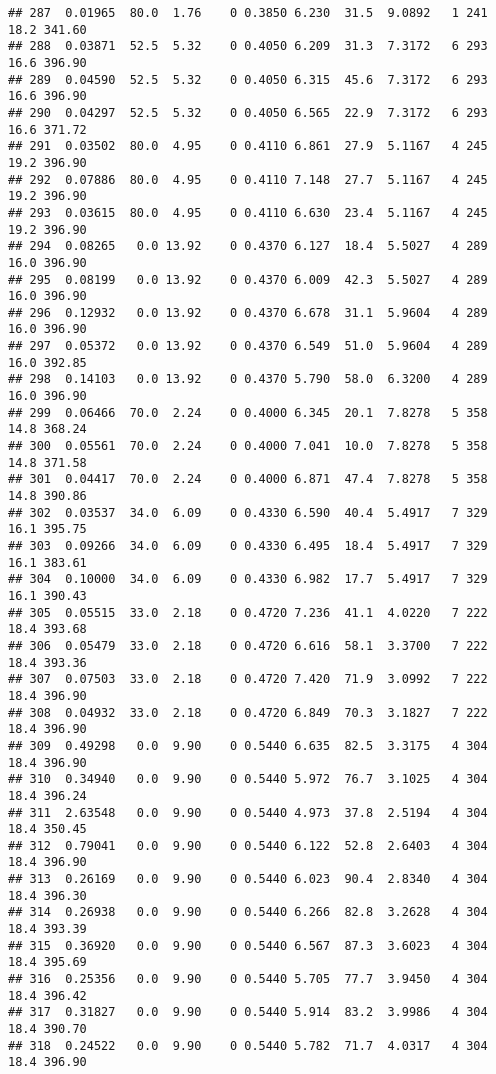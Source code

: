 \documentclass[
]{article}
\begin{document}
\begin{verbatim}
## 287  0.01965  80.0  1.76    0 0.3850 6.230  31.5  9.0892   1 241    18.2 341.60
## 288  0.03871  52.5  5.32    0 0.4050 6.209  31.3  7.3172   6 293    16.6 396.90
## 289  0.04590  52.5  5.32    0 0.4050 6.315  45.6  7.3172   6 293    16.6 396.90
## 290  0.04297  52.5  5.32    0 0.4050 6.565  22.9  7.3172   6 293    16.6 371.72
## 291  0.03502  80.0  4.95    0 0.4110 6.861  27.9  5.1167   4 245    19.2 396.90
## 292  0.07886  80.0  4.95    0 0.4110 7.148  27.7  5.1167   4 245    19.2 396.90
## 293  0.03615  80.0  4.95    0 0.4110 6.630  23.4  5.1167   4 245    19.2 396.90
## 294  0.08265   0.0 13.92    0 0.4370 6.127  18.4  5.5027   4 289    16.0 396.90
## 295  0.08199   0.0 13.92    0 0.4370 6.009  42.3  5.5027   4 289    16.0 396.90
## 296  0.12932   0.0 13.92    0 0.4370 6.678  31.1  5.9604   4 289    16.0 396.90
## 297  0.05372   0.0 13.92    0 0.4370 6.549  51.0  5.9604   4 289    16.0 392.85
## 298  0.14103   0.0 13.92    0 0.4370 5.790  58.0  6.3200   4 289    16.0 396.90
## 299  0.06466  70.0  2.24    0 0.4000 6.345  20.1  7.8278   5 358    14.8 368.24
## 300  0.05561  70.0  2.24    0 0.4000 7.041  10.0  7.8278   5 358    14.8 371.58
## 301  0.04417  70.0  2.24    0 0.4000 6.871  47.4  7.8278   5 358    14.8 390.86
## 302  0.03537  34.0  6.09    0 0.4330 6.590  40.4  5.4917   7 329    16.1 395.75
## 303  0.09266  34.0  6.09    0 0.4330 6.495  18.4  5.4917   7 329    16.1 383.61
## 304  0.10000  34.0  6.09    0 0.4330 6.982  17.7  5.4917   7 329    16.1 390.43
## 305  0.05515  33.0  2.18    0 0.4720 7.236  41.1  4.0220   7 222    18.4 393.68
## 306  0.05479  33.0  2.18    0 0.4720 6.616  58.1  3.3700   7 222    18.4 393.36
## 307  0.07503  33.0  2.18    0 0.4720 7.420  71.9  3.0992   7 222    18.4 396.90
## 308  0.04932  33.0  2.18    0 0.4720 6.849  70.3  3.1827   7 222    18.4 396.90
## 309  0.49298   0.0  9.90    0 0.5440 6.635  82.5  3.3175   4 304    18.4 396.90
## 310  0.34940   0.0  9.90    0 0.5440 5.972  76.7  3.1025   4 304    18.4 396.24
## 311  2.63548   0.0  9.90    0 0.5440 4.973  37.8  2.5194   4 304    18.4 350.45
## 312  0.79041   0.0  9.90    0 0.5440 6.122  52.8  2.6403   4 304    18.4 396.90
## 313  0.26169   0.0  9.90    0 0.5440 6.023  90.4  2.8340   4 304    18.4 396.30
## 314  0.26938   0.0  9.90    0 0.5440 6.266  82.8  3.2628   4 304    18.4 393.39
## 315  0.36920   0.0  9.90    0 0.5440 6.567  87.3  3.6023   4 304    18.4 395.69
## 316  0.25356   0.0  9.90    0 0.5440 5.705  77.7  3.9450   4 304    18.4 396.42
## 317  0.31827   0.0  9.90    0 0.5440 5.914  83.2  3.9986   4 304    18.4 390.70
## 318  0.24522   0.0  9.90    0 0.5440 5.782  71.7  4.0317   4 304    18.4 396.90

\end{verbatim}
\end{document}
